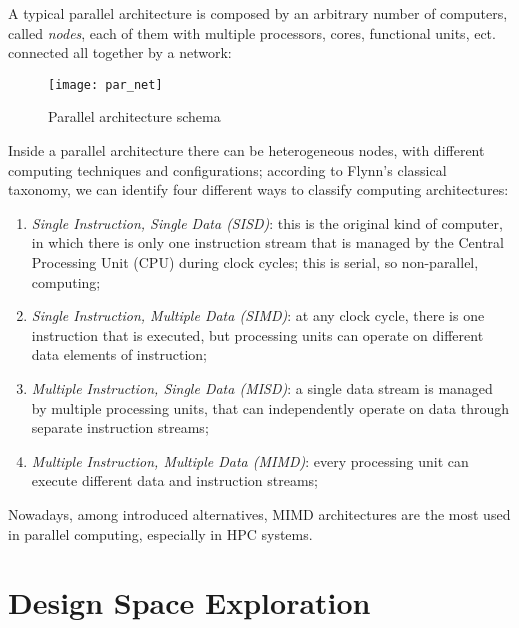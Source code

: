 A typical parallel architecture is composed by an arbitrary number of computers, called \textit{nodes}, each of them with multiple processors, cores, functional units, ect. connected all together by a network:

\begin{figure}[H]

    \centering
    \texttt{[image: par\_net]}
    \caption{Parallel architecture schema}

\end{figure}

Inside a parallel architecture there can be heterogeneous nodes, with different computing techniques and configurations; according to Flynn's classical taxonomy, we can identify four different ways to classify computing architectures: 

\begin{enumerate}

    \item \textit{Single Instruction, Single Data (SISD)}: this is the original kind of computer, in which there is only one instruction stream that is managed by the Central Processing Unit (CPU) during clock cycles; this is serial, so non-parallel, computing;
    
    \item \textit{Single Instruction, Multiple Data (SIMD)}: at any clock cycle, there is one instruction that is executed, but processing units can operate on different data elements of instruction;
    
    \item \textit{Multiple Instruction, Single Data (MISD)}: a single data stream is managed by multiple processing units, that can independently operate on data through separate instruction streams;
    
    \item \textit{Multiple Instruction, Multiple Data (MIMD)}: every processing unit can execute different data and instruction streams;

\end{enumerate}

Nowadays, among introduced alternatives, MIMD architectures are the most used in parallel computing, especially in HPC systems.





\section{Design Space Exploration}

